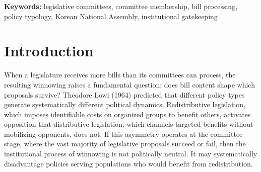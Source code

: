 \documentclass[11pt]{article}
\begin{document}
\begin{abstract}
\noindent When legislatures cannot process every bill, what determines which survive the committee stage? I argue that committee processing operates through two independent gates: an institutional gate, where a sponsor's membership on the reviewing committee is associated with substantially higher processing probability regardless of bill content, and a content gate, where redistributive legislation faces structural friction regardless of the sponsor's institutional position. I test this two-level architecture using 12,889 content-classified bills from the Korean National Assembly (20th and 21st terms, 2016 to 2024). Committee membership emerges as the dominant predictor of processing, substantially more powerful than policy content. Yet the Lowi gradient, the gap between redistributive labor bills and distributive small-business bills, persists at similar magnitudes among committee insiders and outsiders. These findings suggest that winnowing is not content-neutral: institutions and content operate at different thresholds of the same pipeline, with consequences for whose interests the legislative process may systematically disadvantage.
\end{abstract}

\bigskip
\noindent\textbf{Keywords:} legislative committees, committee membership, bill processing, policy typology, Korean National Assembly, institutional gatekeeping

\bigskip
\setcounter{page}{0}
\clearpage


\section{Introduction}\label{sec:intro}

When a legislature receives more bills than its committees can process, the resulting winnowing raises a fundamental question: does bill content shape which proposals survive? Theodore Lowi (1964) predicted that different policy types generate systematically different political dynamics. Redistributive legislation, which imposes identifiable costs on organized groups to benefit others, activates opposition that distributive legislation, which channels targeted benefits without mobilizing opponents, does not. If this asymmetry operates at the committee stage, where the vast majority of legislative proposals succeed or fail, then the institutional process of winnowing is not politically neutral. It may systematically disadvantage policies serving populations who would benefit from redistribution.
\end{document}
